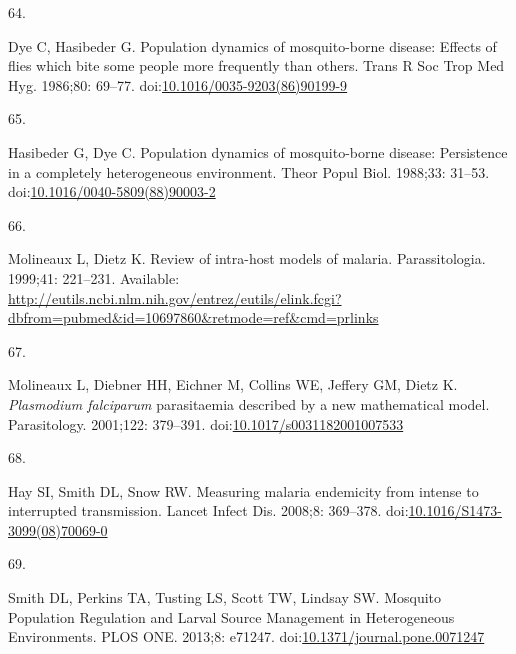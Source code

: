 \documentclass[
]{book}
\newlength{\cslhangindent}
\newlength{\csllabelwidth}
\newlength{\cslentryspacingunit} %
\newenvironment{CSLReferences}[2] %
 {%
  \setlength{\parindent}{0pt}
  \ifodd #1
  \let\oldpar\par
  \def\par{\hangindent=\cslhangindent\oldpar}
  \fi
  \setlength{\parskip}{#2\cslentryspacingunit}
 }%
 {}
\newcommand{\CSLLeftMargin}[1]{\parbox[t]{\csllabelwidth}{#1}}
\newcommand{\CSLRightInline}[1]{\parbox[t]{\linewidth - \csllabelwidth}{#1}\break}
\begin{document}
\begin{CSLReferences}{0}{0}
\leavevmode{}%
\CSLLeftMargin{64. }%
\CSLRightInline{Dye C, Hasibeder G. Population dynamics of mosquito-borne disease: Effects of flies which bite some people more frequently than others. Trans R Soc Trop Med Hyg. 1986;80: 69--77. doi:\href{https://doi.org/10.1016/0035-9203(86)90199-9}{10.1016/0035-9203(86)90199-9}}

\leavevmode{}%
\CSLLeftMargin{65. }%
\CSLRightInline{Hasibeder G, Dye C. Population dynamics of mosquito-borne disease: Persistence in a completely heterogeneous environment. Theor Popul Biol. 1988;33: 31--53. doi:\href{https://doi.org/10.1016/0040-5809(88)90003-2}{10.1016/0040-5809(88)90003-2}}

\leavevmode{}%
\CSLLeftMargin{66. }%
\CSLRightInline{Molineaux L, Dietz K. Review of intra-host models of malaria. Parassitologia. 1999;41: 221--231. Available: \url{http://eutils.ncbi.nlm.nih.gov/entrez/eutils/elink.fcgi?dbfrom=pubmed\&id=10697860\&retmode=ref\&cmd=prlinks}}

\leavevmode{}%
\CSLLeftMargin{67. }%
\CSLRightInline{Molineaux L, Diebner HH, Eichner M, Collins WE, Jeffery GM, Dietz K. \emph{{Plasmodium} falciparum} parasitaemia described by a new mathematical model. Parasitology. 2001;122: 379--391. doi:\href{https://doi.org/10.1017/s0031182001007533}{10.1017/s0031182001007533}}

\leavevmode{}%
\CSLLeftMargin{68. }%
\CSLRightInline{Hay SI, Smith DL, Snow RW. Measuring malaria endemicity from intense to interrupted transmission. Lancet Infect Dis. 2008;8: 369--378. doi:\href{https://doi.org/10.1016/S1473-3099(08)70069-0}{10.1016/S1473-3099(08)70069-0}}

\leavevmode{}%
\CSLLeftMargin{69. }%
\CSLRightInline{Smith DL, Perkins TA, Tusting LS, Scott TW, Lindsay SW. Mosquito {Population} {Regulation} and {Larval} {Source} {Management} in {Heterogeneous} {Environments}. PLOS ONE. 2013;8: e71247. doi:\href{https://doi.org/10.1371/journal.pone.0071247}{10.1371/journal.pone.0071247}}

\end{CSLReferences}
\end{document}
